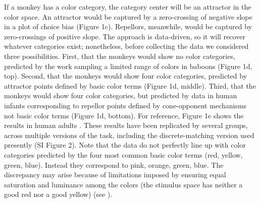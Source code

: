 If a monkey has a color category, the category center will be an attractor in the color space. An attractor would be captured by a zero-crossing of negative slope in a plot of choice bias (Figure 1c). Repellors, meanwhile, would be captured by zero-crossings of positive slope. The approach is data-driven, so it will recover whatever categories exist; nonetheless, before collecting the data we considered three possibilities. First, that the monkeys would show no color categories, predicted by the work sampling a limited range of colors in baboons \citep{davidoff_cross-species_2010} (Figure 1d, top). Second, that the monkeys would show four color categories, predicted by attractor points defined by basic color terms (Figure 1d, middle). Third, that the monkeys would show four color categories, but predicted by data in human infants corresponding to repellor points defined by cone-opponent mechanisms not basic color terms \citep{skelton_biological_2017} (Figure 1d, bottom). For reference, Figure 1e shows the results in human adults \citep{panichello_error-correcting_2019}. These results have been replicated by several groups, across multiple versions of the task, including the discrete-matching version used presently (SI Figure 2). Note that the data do not perfectly line up with color categories predicted by the four most common basic color terms (red, yellow, green, blue). Instead they correspond to pink, orange, green, blue. The discrepancy may arise because of limitations imposed by ensuring equal saturation and luminance among the colors (the stimulus space has neither a good red nor a good yellow) (see \citep{bae_why_2015}). 
